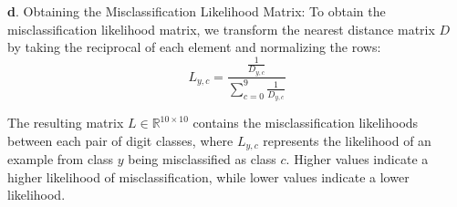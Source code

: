 \textbf{d}. Obtaining the Misclassification Likelihood Matrix:
To obtain the misclassification likelihood matrix, we transform the nearest distance matrix $D$ by taking the reciprocal of each element and normalizing the rows:
\begin{equation}
L_{y,c} = \frac{\frac{1}{D_{y,c}}}{\sum\limits_{c=0}^9 \frac{1}{D_{y,c}}}
\label{eq:reciprocal_distance_matrix_eg_likelihood_matrix}
\end{equation}

The resulting matrix $L \in \mathbb{R}^{10 \times 10}$ contains the misclassification likelihoods between each pair of digit classes, where $L_{y,c}$ represents the likelihood of an example from class $y$ being misclassified as class $c$. Higher values indicate a higher likelihood of misclassification, while lower values indicate a lower likelihood.










